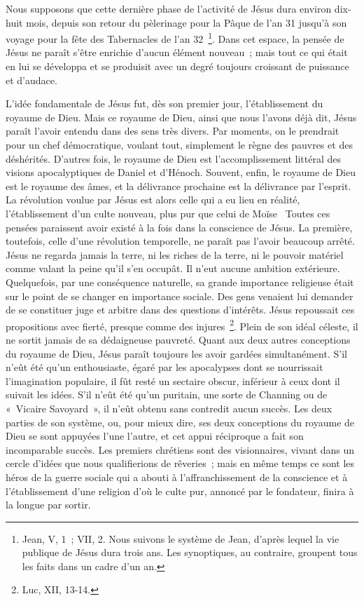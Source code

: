\documentclass[french,twoside]{book} %
\newcommand\chaptercont{} %
\begin{document}
\chaptercont
\noindent Nous supposons que cette dernière phase de l’activité de Jésus dura environ dix-huit mois, depuis son retour du pèlerinage pour la Pâque de l’an 31 jusqu’à son voyage pour la fête des Tabernacles de l’an 32 \footnote{Jean, V, 1 ; VII, 2. Nous suivons le système de Jean, d’après lequel la vie publique de Jésus dura trois ans. Les synoptiques, au contraire, groupent tous les faits dans un cadre d’un an.}. Dans cet espace, la pensée de Jésus ne paraît s’être enrichie d’aucun élément nouveau ; mais tout ce qui était en lui se développa et se produisit avec un degré toujours croissant de puissance et d’audace.\par
L’idée fondamentale de Jésus fut, dès son premier jour, l’établissement du royaume de Dieu. Mais ce royaume de Dieu, ainsi que nous l’avons déjà dit, Jésus paraît l’avoir entendu dans des sens très divers. Par moments, on le prendrait pour un chef démocratique, voulant tout, simplement le règne des pauvres et des déshérités. D’autres fois, le royaume de Dieu est l’accomplissement littéral des visions apocalyptiques de Daniel et d’Hénoch. Souvent, enfin, le royaume de Dieu est le royaume des âmes, et la délivrance prochaine est la délivrance par l’esprit. La révolution voulue par Jésus est alors celle qui a eu lieu en réalité, l’établissement d’un culte nouveau, plus pur que celui de Moïse  Toutes ces pensées paraissent avoir existé à la fois dans la conscience de Jésus. La première, toutefois, celle d’une révolution temporelle, ne paraît pas l’avoir beaucoup arrêté. Jésus ne regarda jamais la terre, ni les riches de la terre, ni le pouvoir matériel comme valant la peine qu’il s’en occupât. Il n’eut aucune ambition extérieure. Quelquefois, par une conséquence naturelle, sa grande importance religieuse était sur le point de se changer en importance sociale. Des gens venaient lui demander de se constituer juge et arbitre dans des questions d’intérêts. Jésus repoussait ces propositions avec fierté, presque comme des injures \footnote{Luc, XII, 13-14.}. Plein de son idéal céleste, il ne sortit jamais de sa dédaigneuse pauvreté. Quant aux deux autres conceptions du royaume de Dieu, Jésus paraît toujours les avoir gardées simultanément. S’il n’eût été qu’un enthousiaste, égaré par les apocalypses dont se nourrissait l’imagination populaire, il fût resté un sectaire obscur, inférieur à ceux dont il suivait les idées. S’il n’eût été qu’un puritain, une sorte de Channing ou de « Vicaire Savoyard », il n’eût obtenu sans contredit aucun succès. Les deux parties de son système, ou, pour mieux dire, ses deux conceptions du royaume de Dieu se sont appuyées l’une l’autre, et cet appui réciproque a fait son incomparable succès. Les premiers chrétiens sont des visionnaires, vivant dans un cercle d’idées que nous qualifierions de rêveries ; mais en même temps ce sont les héros de la guerre sociale qui a abouti à l’affranchissement de la conscience et à l’établissement d’une religion d’où le culte pur, annoncé par le fondateur, finira à la longue par sortir.\par
\end{document}
